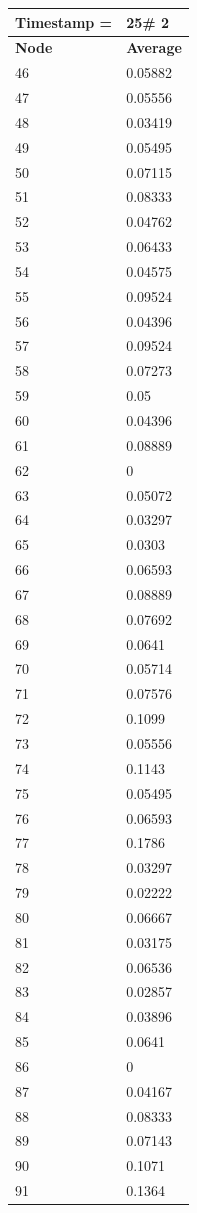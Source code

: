 \begin{tabular}{|l||l|}
\hline
\textbf{Timestamp =} & \textbf{25}\# 2\\\hline
	\textbf{Node} & \textbf{Average} \\ \hline
\hline
	46 & 0.05882 \\ \hline
	47 & 0.05556 \\ \hline
	48 & 0.03419 \\ \hline
	49 & 0.05495 \\ \hline
	50 & 0.07115 \\ \hline
	51 & 0.08333 \\ \hline
	52 & 0.04762 \\ \hline
	53 & 0.06433 \\ \hline
	54 & 0.04575 \\ \hline
	55 & 0.09524 \\ \hline
	56 & 0.04396 \\ \hline
	57 & 0.09524 \\ \hline
	58 & 0.07273 \\ \hline
	59 & 0.05 \\ \hline
	60 & 0.04396 \\ \hline
	61 & 0.08889 \\ \hline
	62 & 0 \\ \hline
	63 & 0.05072 \\ \hline
	64 & 0.03297 \\ \hline
	65 & 0.0303 \\ \hline
	66 & 0.06593 \\ \hline
	67 & 0.08889 \\ \hline
	68 & 0.07692 \\ \hline
	69 & 0.0641 \\ \hline
	70 & 0.05714 \\ \hline
	71 & 0.07576 \\ \hline
	72 & 0.1099 \\ \hline
	73 & 0.05556 \\ \hline
	74 & 0.1143 \\ \hline
	75 & 0.05495 \\ \hline
	76 & 0.06593 \\ \hline
	77 & 0.1786 \\ \hline
	78 & 0.03297 \\ \hline
	79 & 0.02222 \\ \hline
	80 & 0.06667 \\ \hline
	81 & 0.03175 \\ \hline
	82 & 0.06536 \\ \hline
	83 & 0.02857 \\ \hline
	84 & 0.03896 \\ \hline
	85 & 0.0641 \\ \hline
	86 & 0 \\ \hline
	87 & 0.04167 \\ \hline
	88 & 0.08333 \\ \hline
	89 & 0.07143 \\ \hline
	90 & 0.1071 \\ \hline
	91 & 0.1364 \\ \hline
\end{tabular}
